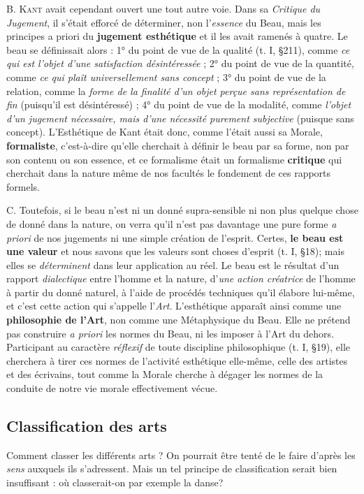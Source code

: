 B. \textsc{Kant} avait cependant ouvert une tout autre voie. Dans sa
{\it Critique du Jugement}, il s'était efforcé de déterminer, non l'{\it essence}
du Beau, mais les principes a priori du {\bf jugement esthétique} et il les
avait ramenés à quatre. Le beau se définissait alors : 1° du point de vue de
la qualité (t. I, \S 211), comme {\it ce qui est l’objet d’une satisfaction désintéressée} ;
2° du point de vue de la quantité, comme {\it ce qui plaît universellement
sans concept} ; 3° du point de vue de la relation, comme la
{\it forme de la finalité d’un objet perçue sans représentation de fin} (puisqu’il
est désintéressé) ; 4° du point de vue de la modalité, comme
{\it l’objet d’un jugement nécessaire, mais d’une nécessité purement subjective}
(puisque sans concept). L’Esthétique de Kant était donc, comme
l'était aussi sa Morale, {\bf formaliste}, c’est-à-dire qu’elle cherchait à
définir le beau par sa forme, non par son contenu ou son essence,
et ce formalisme était un formalisme {\bf critique} qui cherchait dans la
nature même de nos facultés le fondement de ces rapports formels.

C. Toutefois, si le beau n’est ni un donné supra-sensible ni non plus
quelque chose de donné dans la nature, on verra qu’il n’est pas davantage
une pure forme {\it a priori} de nos jugements ni une simple création
de l'esprit. Certes, {\bf le beau est une valeur} et nous savons que les
valeurs sont choses d'esprit (t. I, \S 18); mais elles se {\it déterminent}
dans leur application au réel. Le beau est le résultat d’un rapport
{\it dialectique} entre l’homme et la nature, d’{\it une action créatrice} de l’homme
à partir du donné naturel, à l’aide de procédés techniques qu’il élabore
lui-même, et c’est cette action qui s’appelle l’{\it Art}. L’esthétique apparaît
ainsi comme une {\bf philosophie de l'Art}, non comme une Métaphysique
du Beau. Elle ne prétend pas construire {\it a priori} les normes
du Beau, ni les imposer à l’Art du dehors. Participant au caractère
{\it réflexif} de toute discipline philosophique (t. I, \S 19), elle cherchera à
tirer ces normes de l’activité esthétique elle-même, celle des artistes
et des écrivains, tout comme la Morale cherche à dégager les normes
de la conduite de notre vie morale effectivement vécue.

\subsection{Classification des arts}
Comment classer les différents
arts ? On pourrait être tenté de le faire d’après les {\it sens} auxquels ils
s’adressent. Mais un tel principe de classification serait bien insuffisant :
où classerait-on par exemple la danse?


